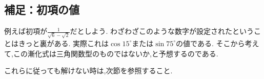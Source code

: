     \subsection{補足：初項の値}\label{節：補足：初項の値}
      例えば初項が$\displaystyle \frac{1}{\sqrt{6}-\sqrt{2}}$だとしよう.
      わざわざこのような数字が設定されたということはきっと裏がある.
      実際これは$\cos 15^\circ$または$\sin 75^\circ$の値である.
      そこから考えて,この漸化式は三角関数型のものではないか,と予想するのである.
    
    これらに従っても解けない時は,次節を参照すること.
 
